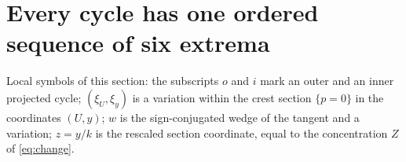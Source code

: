 \section{Every cycle has one ordered sequence of six extrema}\label{sec:geometry}
Local symbols of this section: the subscripts $o$ and $i$ mark an outer and an inner projected cycle; $(\xi_U,\xi_y)$ is a variation within the crest section $\{p=0\}$ in the coordinates $(U,y)$; $w$ is the sign-conjugated wedge of the tangent and a variation; $z=y/k$ is the rescaled section coordinate, equal to the concentration $Z$ of \eqref{eq:change}.

